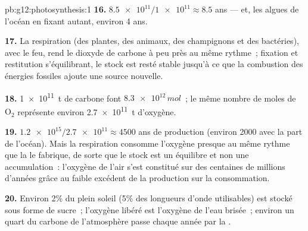 \begin{solution}{pb:g12:photosynthesis:1}
\textbf{16.} $\num{8.5e11}/\num{1e11} \approx 8.5$ ans --- et, les
algues de l'océan en fixant autant, environ 4 ans.

\textbf{17.} La respiration (des plantes, des animaux, des
champignons et des bactéries), avec le feu, rend le dioxyde de carbone
à peu près au même rythme~; fixation et restitution s'équilibrant, le
stock est resté stable jusqu'à ce que la combustion des énergies
fossiles ajoute une source nouvelle.

\textbf{18.} \qty{1e11}{t} de carbone font
$\num{8.3e12}\,\unit{mol}$~; le même nombre de moles de
$\mathrm{O_2}$ représente environ \qty{2.7e11}{t} d'oxygène.

\textbf{19.} $\num{1.2e15}/\num{2.7e11} \approx 4500$ ans de
production (environ 2000 avec la part de l'océan). Mais la respiration
consomme l'oxygène presque au même rythme que la  le
fabrique, de sorte que le stock est un équilibre et non une
accumulation~: l'oxygène de l'air s'est constitué sur des centaines de
millions d'années grâce au faible excédent de la production sur la
consommation.

\textbf{20.} Environ 2\% du plein soleil (5\% des longueurs d'onde
utilisables) est stocké sous forme de sucre~; l'oxygène libéré est
l'oxygène de l'eau brisée~; environ un quart du carbone de
l'atmosphère passe chaque année par la .
\end{solution}
